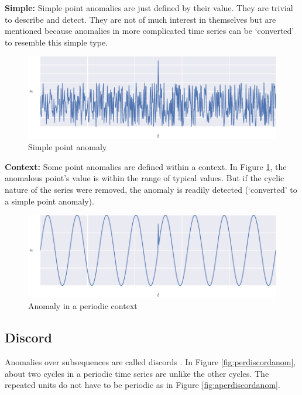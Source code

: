 \textbf{Simple:} Simple point anomalies are just defined by their value. They are trivial to describe and detect. They are not of much interest in themselves but are mentioned because anomalies in more complicated time series can be `converted' to resemble this simple type.

\begin{figure}[H]
  \centering
  \includegraphics{figs/trivial.pdf}
  \caption{Simple point anomaly}
\end{figure}


\textbf{Context:} Some point anomalies are defined within a context. In Figure \ref{fig:contextanom}, the anomalous point's value is within the range of typical values. But if the cyclic nature of the series were removed, the anomaly is readily detected (`converted' to a simple point anomaly).

\begin{figure}[H]
  \centering
  \includegraphics{figs/context.pdf}
  \caption{Anomaly in a periodic context}
  \label{fig:contextanom}
\end{figure}


\subsection{Discord}

Anomalies over subsequences are called discords \cite{Cheboli2010}. In Figure \ref{fig:perdiscordanom}, about two cycles in a periodic time series are unlike the other cycles. The repeated units do not have to be periodic as in Figure \ref{fig:aperdiscordanom}.

